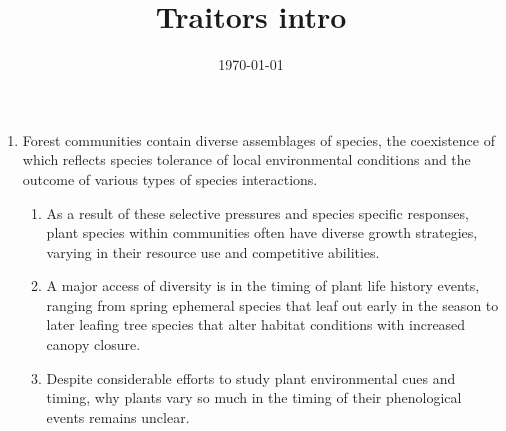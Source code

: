 \documentclass{article}
\begin{document}
\title{Traitors intro}
\date{\today}

\maketitle 

\begin{enumerate}

\item Forest communities contain diverse assemblages of species, the coexistence of which reflects species tolerance of local environmental conditions and the outcome of various types of species interactions. 
\begin{enumerate}
\item As a result of these selective pressures and species specific responses, plant species within communities often have diverse growth strategies, varying in their resource use and competitive abilities. 
\item  A major access of diversity is in the timing of plant life history events, ranging from spring ephemeral species that leaf out early in the season to later leafing tree species that alter habitat conditions with increased canopy closure.
\item Despite considerable efforts to study plant environmental cues and timing, why plants vary so much in the timing of their phenological events remains unclear.
\end{enumerate}


\end{enumerate}
\end{document}

